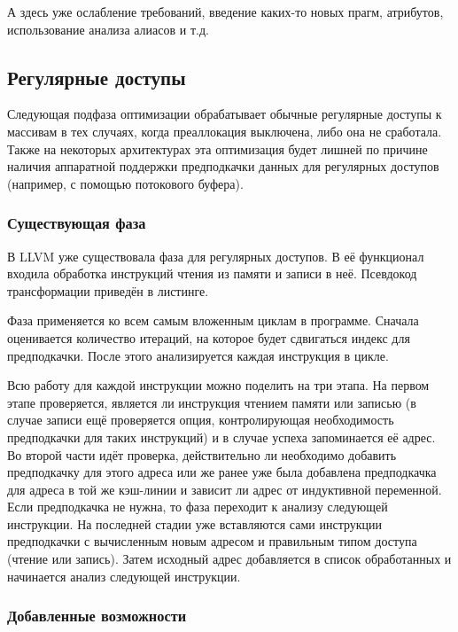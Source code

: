 \documentclass[12pt,a4paper]{article}
\begin{document}
А здесь уже ослабление требований, введение каких-то новых прагм, атрибутов, использование анализа алиасов и т.д.

\subsection{Регулярные доступы}

\indent

Следующая подфаза оптимизации обрабатывает обычные регулярные доступы к массивам в тех случаях, когда преаллокация выключена, либо она не сработала. Также на некоторых архитектурах эта оптимизация будет лишней по причине наличия аппаратной поддержки предподкачки данных для регулярных доступов (например, с помощью потокового буфера).

\subsubsection{Существующая фаза}

\indent

В LLVM уже существовала фаза для регулярных доступов. В её функционал входила обработка инструкций чтения из памяти и записи в неё. Псевдокод трансформации приведён в листинге.



Фаза применяется ко всем самым вложенным циклам в программе. Сначала оценивается количество итераций, на которое будет сдвигаться индекс для предподкачки. После этого анализируется каждая инструкция в цикле.

Всю работу для каждой инструкции можно поделить на три этапа. На первом этапе проверяется, является ли инструкция чтением памяти или записью (в случае записи ещё проверяется опция, контролирующая необходимость предподкачки для таких инструкций) и в случае успеха запоминается её адрес. Во второй части идёт проверка, действительно ли необходимо добавить предподкачку для этого адреса или же ранее уже была добавлена предподкачка для адреса в той же кэш-линии и зависит ли адрес от индуктивной переменной. Если предподкачка не нужна, то фаза переходит к анализу следующей инструкции. На последней стадии уже вставляются сами инструкции предподкачки с вычисленным новым адресом и правильным типом доступа (чтение или запись). Затем исходный адрес добавляется в список обработанных и начинается анализ следующей инструкции.

\subsubsection{Добавленные возможности}
\end{document}
